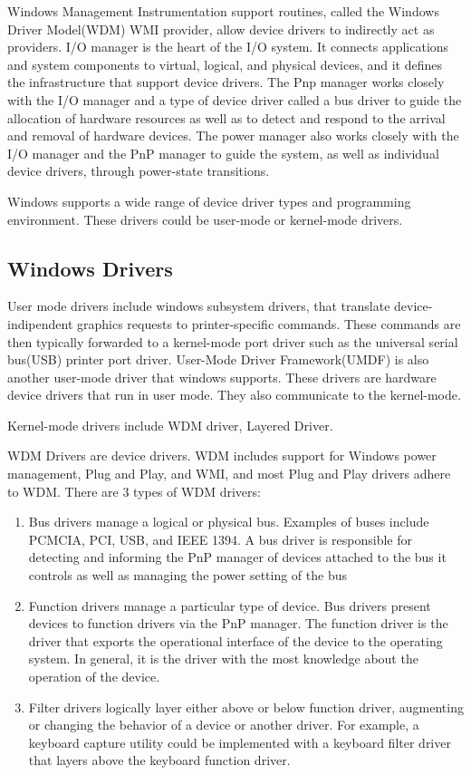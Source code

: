 \documentclass[letterpaper,10pt,draftclsnofoot,onecolumn]{IEEEtran}
\begin{document}
Windows Management Instrumentation support routines, called the Windows Driver Model(WDM) WMI provider, allow device drivers to indirectly act as providers. I/O manager is the heart of the I/O system. It connects applications and system components to virtual, logical, and physical devices, and it defines the infrastructure that support device drivers. The Pnp manager works closely with the I/O manager and a type of device driver called a bus driver to guide the allocation of hardware resources as well as to detect and respond to the arrival and removal of hardware devices. The power manager also works closely with the I/O manager and the PnP manager to guide the system, as well as individual device drivers, through power-state transitions.

Windows supports a wide range of device driver types and programming environment. These drivers could be user-mode or kernel-mode drivers.

\subsection*{Windows Drivers}

User mode drivers include windows subsystem drivers, that translate device-indipendent graphics requests to printer-specific commands. These commands are then typically forwarded to a kernel-mode port driver such as the universal serial bus(USB) printer port driver. User-Mode Driver Framework(UMDF) is also another user-mode driver that windows supports. These drivers are hardware device drivers that run in user mode. They also communicate to the kernel-mode. 

Kernel-mode drivers include WDM driver, Layered Driver. 

WDM Drivers are device drivers. WDM includes support for Windows power management, Plug and Play, and WMI, and most Plug and Play drivers adhere to WDM. There are 3 types of WDM drivers:\cite{[1]}

\begin{enumerate}
\item Bus drivers manage a logical or physical bus. Examples of buses include PCMCIA, PCI, USB, and IEEE 1394. A bus driver is responsible for detecting and informing the PnP manager of devices attached to the bus it controls as well as managing the power setting of the bus
\item Function drivers manage a particular type of device. Bus drivers present devices to function drivers via the PnP manager. The function driver is the driver that exports the operational interface of the device to the operating system. In general, it is the driver with the most knowledge about the operation of the device.
\item Filter drivers logically layer either above or below function driver, augmenting or changing the behavior of a device or another driver. For example, a keyboard capture utility could be implemented with a keyboard filter driver that layers above the keyboard function driver.
\end{enumerate}
\end{document}
